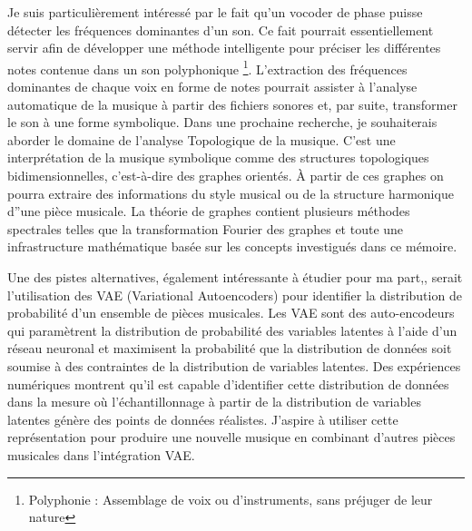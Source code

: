 Je suis particulièrement intéressé par le fait qu’un vocoder de phase puisse détecter les fréquences dominantes d'un son. Ce fait pourrait essentiellement servir afin de développer une méthode intelligente pour préciser les différentes notes contenue dans un son polyphonique \footnote{Polyphonie : Assemblage de voix ou d'instruments, sans préjuger de leur nature}. L'extraction des fréquences dominantes de chaque voix en forme de notes pourrait assister à l'analyse automatique de la musique à partir des fichiers sonores et, par suite, transformer le son à une forme symbolique. Dans une prochaine recherche, je souhaiterais aborder le domaine de l'analyse Topologique de la musique. C’est une interprétation de la musique symbolique comme des structures topologiques bidimensionnelles, c'est-à-dire des graphes orientés. À partir de ces graphes on pourra extraire des informations du style musical ou de la structure harmonique d”une pièce musicale. La théorie de graphes contient plusieurs méthodes spectrales telles que la transformation Fourier des graphes et toute une infrastructure mathématique basée sur les concepts investigués dans ce mémoire.

Une  des pistes alternatives, également intéressante à étudier pour ma part,, serait l’utilisation des VAE (Variational Autoencoders) pour identifier la distribution de probabilité d’un ensemble de pièces musicales. Les VAE sont des auto-encodeurs qui paramètrent la distribution de probabilité des variables latentes à l'aide d'un réseau neuronal et maximisent la probabilité que la distribution de données soit soumise à des contraintes de la distribution de variables latentes. Des expériences numériques montrent qu’il est capable d’identifier cette distribution de données dans la mesure où l’échantillonnage à partir de la distribution de variables latentes génère des points de données réalistes. J'aspire à utiliser cette représentation pour produire une nouvelle musique en combinant d'autres pièces musicales dans l'intégration VAE.

